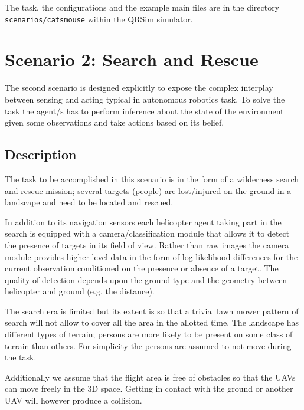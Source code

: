 \documentclass[a4paper,11pt]{report}
\newcommand{\sname}{QRSim\xspace}
\newcommand\mytexttt[1]{\texttt{\hyphenchar\font=45\relax #1}}
\begin{document}
The task, the configurations and the example main files are in the directory \mytexttt{scenarios/catsmouse} within the \sname simulator. 

\newpage
\chapter{Scenario 2: Search and Rescue}
The second scenario is designed explicitly to expose the complex interplay between sensing and acting typical in autonomous robotics task. To solve the task the agent/s has to perform inference about the state of the environment given some observations and take actions based on its belief. 

\section{Description}
The task to be accomplished in this scenario is in the form of a wilderness search and rescue mission; several targets (people) are lost/injured on the ground in a landscape and need to be located and rescued. 

In addition to its navigation sensors each helicopter agent taking part in the search 
is equipped with a camera/classification module that allows it to detect the presence of targets in its field of view. Rather than raw images the camera module provides higher-level data in the form of log likelihood differences for the current observation conditioned on the presence or absence of a target. The quality of detection depends upon the ground type and the geometry between helicopter and ground (e.g. the distance).  

The search era is limited but its extent is so that a trivial lawn mower pattern of search will not allow to cover all the area in the allotted time. The landscape has different types of terrain; persons are more likely to be present on some class of terrain than others. For simplicity the persons are assumed to not move during the task. 

Additionally we assume that the flight area is free of obstacles so that the UAVs can move freely in the 3D space. Getting in contact with the ground or another UAV will however produce a collision.
\end{document}
